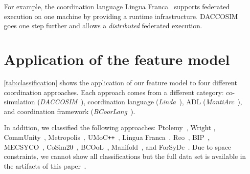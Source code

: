 \documentclass[runningheads]{llncs}
\begin{document}
For example, the coordination language Lingua Franca~\cite{lohstrohReactorsDeterministicModel2020} supports federated execution on one machine by providing a runtime infrastructure.
DACCOSIM~\cite{galtierFMIBasedDistributedMultisimulation2015} goes one step further and allows a \textit{distributed} federated execution.


\section{Application of the feature model} \label{sec: application}
\autoref{tab:classification} shows the application of our feature model to four different coordination approaches.
Each approach comes from a different category: co-simulation (\textit{DACCOSIM}~\cite{galtierFMIBasedDistributedMultisimulation2015,dadSynthesisFeedbackDistribution2021}), coordination language (\textit{Linda}~\cite{carrieroLindaContext1989,carrieroLindaAlternativeMessagepassing1994}), ADL (\textit{MontiArc}~\cite{haberMontiArcArchitecturalModeling2014}), and coordination framework (\textit{BCoorLang}~\cite{krauterBehavioralConsistencyHeterogeneous2021,krauterBehavioralConsistencyMultimodeling2023}).

In addition, we classified the following approaches: Ptolemy~\cite{ekerTamingHeterogeneityPtolemy2003,ptolemaeusSystemDesignModeling2014}, Wright \cite{allenFormalBasisArchitectural1997,allenFormalApproachSoftware1997}, CommUnity~\cite{fiadeiroSemanticsArchitecturalConnectors1997,oliveiraCommUnityWorkbench2007}, Metropolis~\cite{balarinMetropolisIntegratedElectronic2003}, UMoC\texttt{++}~\cite{mathaikuttyUMoCBasedMultiMoC2006}, Lingua Franca~\cite{lohstrohReactorsDeterministicModel2020,lohstrohLinguaFrancaDeterministic2021}, Reo~\cite{arbabReoChannelbasedCoordination2004}, BIP~\cite{bliudzeAlgebraConnectorsStructuring2008,basuRigorousComponentBasedSystem2011},
MECSYCO~\cite{camusCosimulationCyberphysicalSystems2018,camusHybridCosimulationFMUs2016},
CoSim20~\cite{liboniComplexSystemsCosimulation2021},
BCOoL~\cite{varalarsenBehavioralCoordinationOperator2015,varalarsenBCOolBehavioralCoordination2016},
Manifold~\cite{arbabOverviewManifoldIts1993,papadopoulosModellingActivitiesInformation1998}, and ForSyDe~\cite{sanderSystemModelingTransformational2004,sanderForSyDeSystemDesign2016}.
Due to space constraints, we cannot show all classifications but the full data set is available in the artifacts of this paper~\cite{timkrauterArtifactsCoordination2024}.
\end{document}

